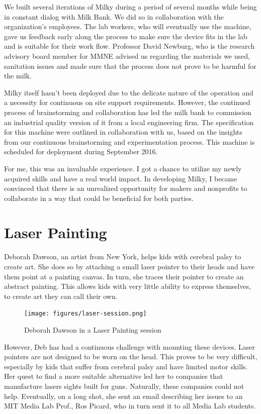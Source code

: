 We built several iterations of Milky during a period of several months while being in constant dialog with Milk Bank. We did so in collaboration with the organization's employees. The lab workers, who will eventually use the machine, gave us feedback early along the process to make sure the device fits in the lab and is suitable for their work flow. Professor David Newburg, who is the research advisory board member for MMNE advised us regarding the materials we used, sanitation issues and made sure that the process does not prove to be harmful for the milk. 

Milky itself hasn't been deployed due to the delicate nature of the operation and a necessity for continuous on site support requirements. However, the continued process of brainstorming and collaboration has led the milk bank to commission an industrial quality version of it from a local engineering firm. The specification for this machine were outlined in collaboration with us, based on the insights from our continuous brainstorming and experimentation process. This machine is scheduled for deployment during September 2016.

For me, this was an invaluable experience. I got a chance to utilize my newly acquired skills and have a real world impact.  In developing Milky, I became convinced that there is an unrealized opportunity for makers and nonprofits to collaborate in a way that could be beneficial for both parties.

\section{Laser Painting}

Deborah Dawson, an artist from New York, helps kids with cerebral palsy to create art. She does so by attaching a small laser pointer to their heads and have them point at a painting canvas. In turn, she traces their pointer to create an abstract painting. This allows kids with very little ability to express themselves, to create art they can call their own.

   \begin{figure}[thpb]
      \centering
      \texttt{[image: figures/laser-session.png]}
      \caption{Deborah Dawson in a Laser Painting session}
      \label{laser-session}
   \end{figure}

However, Deb  has had a continuous challenge with mounting these devices. Laser pointers are not designed to be worn on the head. This proves to be very difficult, especially by kids that suffer from cerebral palsy and have limited motor skills. Her quest to find a more suitable alternative led her to companies that manufacture lasers sights built for guns. Naturally, these companies could not help. Eventually, on a long shot, she sent an email describing her issues to an MIT Media Lab Prof., Ros Picard, who in turn sent it to all Media Lab students. 

